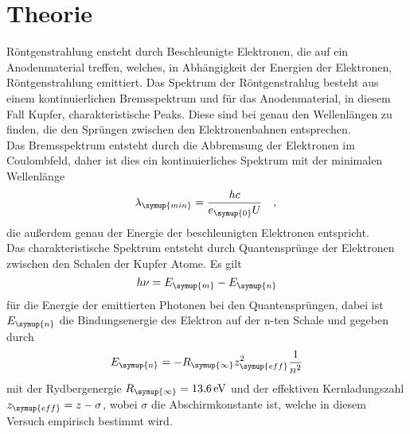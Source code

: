 \section{Theorie}
\label{sec:Theorie}
Röntgenstrahlung ensteht durch Beschleunigte Elektronen, die auf ein Anodenmaterial
treffen, welches, in Abhängigkeit der Energien der Elektronen, Röntgenstrahlung
emittiert. Das Spektrum der Röntgenstrahlug besteht aus einem kontinuierlichen Bremsspektrum
und für das Anodenmaterial, in diesem Fall Kupfer, charakteristische Peaks.
Diese sind bei genau den Wellenlängen zu finden, die den Sprüngen zwischen den
Elektronenbahnen entsprechen.\\
Das Bremsspektrum entsteht durch die Abbremsung der Elektronen im Coulombfeld, daher ist
dies ein kontinuierliches Spektrum mit der minimalen Wellenlänge
\begin{equation}
  \lambda_\symup{min} = \dfrac{hc}{e_\symup{0}U} \quad,
  \label{eqn:lambda_min}\\
\end{equation}
die außerdem genau der Energie der beschleunigten Elektronen entspricht.\\
Das charakteristische Spektrum entsteht durch Quantensprünge der Elektronen zwischen
den Schalen der Kupfer Atome. Es gilt
\begin{equation}
  h \nu = E_\symup{m} - E_\symup{n}
  \label{eqn:hnu}\\
\end{equation}
für die Energie der emittierten Photonen bei den Quantensprüngen, dabei ist $E_\symup{n}$ die
Bindungsenergie des Elektron auf der n-ten Schale und gegeben durch
\begin{equation}
  E_\symup{n} = -R_\symup{\infty} z_\symup{eff}^2 \dfrac{1}{n^2}
  \label{eqn:E_n}\\
\end{equation}
mit der Rydbergenergie $R_\symup{\infty} = \SI{13.6}{\electronvolt}$ und der effektiven
Kernladungszahl $z_\symup{eff} = z - \sigma$, wobei $\sigma$ die Abschirmkonstante ist, welche
in diesem Versuch empirisch bestimmt wird.

